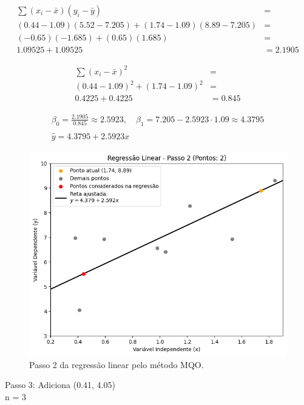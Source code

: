 \begin{align*}
	\sum (x_i - \bar{x})(y_i - \bar{y}) &= \\
	(0.44 - 1.09)(5.52 - 7.205) + (1.74 - 1.09)(8.89 - 7.205) &=\\
	(-0.65)(-1.685) + (0.65)(1.685) &= \\
	1.09525 + 1.09525 &= 2.1905
\end{align*}

\begin{align*}
	\sum (x_i - \bar{x})^2 &=\\ 
	(0.44 - 1.09)^2 + (1.74 - 1.09)^2 &=\\
	0.4225 + 0.4225 &= 0.845
\end{align*}

\begin{gather*}
	\beta_0 = \frac{2.1905}{0.845} \approx 2.5923, \quad \beta_1 = 7.205 - 2.5923 \cdot 1.09 \approx 4.3795\\ \\
	\hat{y} = 4.3795 + 2.5923x
\end{gather*}

\begin{figure}[H]
	\caption{\label{fig:mqo_2}Passo 2 da regressão linear pelo método MQO.}
	\begin{center}
		\includegraphics[scale=0.5]{figuras/RL_step_2.png}
	\end{center}
\end{figure}

Passo 3: Adiciona (0.41, 4.05)
\\ n = 3

